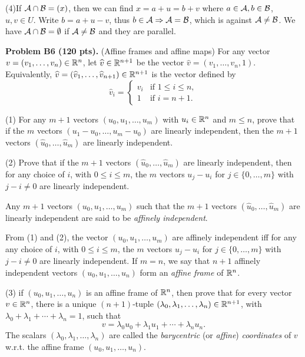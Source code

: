 \documentclass[12pt]{article}
\begin{document}
\medskip
(4)If ${\cal A}\cap {\cal B} = (x)$, then we can find $x = a + u = b + v$ where $a \in {\cal A}, b \in {\cal B}$, $u, v \in U$. Write $b = a + u - v$, thus $b \in {\cal A} \Rightarrow {\cal A} = {\cal B}$, which is against ${\cal A} \neq {\cal B}$. We have ${\cal A} \cap {\cal B} = \emptyset$ if ${\cal A} \neq {\cal B}$ and they are parallel. 

\vspace {0.25cm}\noindent
{\bf Problem B6 (120 pts).} (Affine frames and affine maps)
For any vector $v = (v_1, \ldots, v_n) \in \mathbb{R}^n$, let 
$\widehat{v}\in \mathbb{R}^{n+1}$ be the vector 
$\widehat{v} = (v_1, \ldots, v_n,1)$. 
Equivalently, 
$\widehat{v} = (\widehat{v}_1, \ldots, \widehat{v}_{n+1})\in \mathbb{R}^{n+1}$
is the vector defined by
\[
\widehat{v}_i=
\begin{cases}
v_i & \text{if $1\leq i \leq n$}, \\
1 & \text{if $i = n + 1$}.
\end{cases}
\]

(1)
For any $m + 1$ vectors $(u_0, u_1, \ldots, u_{m })$ 
with $u_i \in \mathbb{R}^n$  and  $m \leq n$, prove that
if the $m$ vectors $(u_1 - u_0, \ldots, u_m - u_0)$ are linearly
independent, then the $m + 1$ vectors
$(\widehat{u}_0, \ldots,  \widehat{u}_m)$ are linearly independent.

\medskip
(2) Prove that if  the $m + 1$ vectors
$(\widehat{u}_0,  \ldots,  \widehat{u}_m)$ are linearly independent,
then
for any choice of $i$, with $0 \leq i \leq m$, the
$m$ vectors $u_j - u_i$  for $j \in \{0, \ldots, m\}$ with $j - i \not = 0$
are linearly independent.

\medskip
Any $m + 1$ vectors  $(u_0, u_1, \ldots, u_{m })$ such that
the  $m + 1$ vectors
$(\widehat{u}_0, \ldots,  \widehat{u}_m)$ are linearly independent
are said to be {\it affinely independent\/}.

\medskip
From (1) and (2), the vector $(u_0, u_1, \ldots, u_{m })$ 
are affinely independent iff
for any  any choice of $i$, with $0 \leq i \leq m$, the
$m$ vectors $u_j - u_i$  for $j \in \{0, \ldots, m\}$ with $j - i \not = 0$
are linearly independent.
If $m = n$,  we say that $n + 1$ affinely independent 
vectors  $(u_0, u_1, \ldots, u_{n })$ form an {\it affine frame\/} of $\mathbb{R}^n$. 

\medskip
(3) if $(u_0, u_1, \ldots, u_{n })$ is an affine frame of $\mathbb{R}^n$,
then prove that for every vector $v\in \mathbb{R}^n$,  
there is a unique $(n + 1)$-tuple
$(\lambda_0, \lambda_1, \ldots, \lambda_n)\in \mathbb{R}^{n + 1}$, with
$\lambda_0 + \lambda_1 + \cdots + \lambda_n = 1$, such that
\[
v = \lambda_0 u_0 + \lambda_1 u_1 + \cdots + \lambda_n u_n.
\]
The scalars $(\lambda_0, \lambda_1, \ldots, \lambda_n)$ are called the
{\it barycentric\/} (or {\it affine\/}) {\it coordinates\/} of $v$
w.r.t. the affine frame   $(u_0, u_1, \ldots, u_{n })$.
\end{document}
